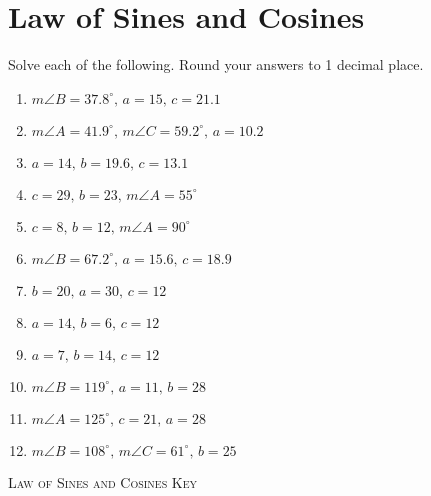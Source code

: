 \chapter{Law of Sines and Cosines}

Solve each of the following. Round your answers to 1 decimal place.

\begin{enumerate}
	\item $m\angle B = 37.8^\circ, \, a = 15, \, c = 21.1$
    \item $m\angle A = 41.9^\circ, \, m\angle C = 59.2^\circ, \, a = 10.2$
    \item $a = 14, \, b = 19.6, \, c = 13.1$
    
    \item $c = 29, \, b = 23, \, m\angle A = 55^\circ$
    \item $c = 8, \, b = 12, \, m\angle A = 90^\circ$
    \item $m\angle B = 67.2^\circ, \, a = 15.6, \, c = 18.9$
    \item $b = 20, \, a = 30, \, c = 12$
    \item $a = 14, \, b = 6, \, c = 12$
    \item $a = 7, \, b = 14, \, c = 12$
    \item $m\angle B = 119^\circ, \, a = 11, \, b = 28$
    \item $m\angle A = 125^\circ, \, c = 21, \, a = 28$
    \item $m\angle B = 108^\circ, \, m\angle C = 61^\circ, \, b = 25$
\end{enumerate}

\newpage

\textsc{Law of Sines and Cosines Key}

